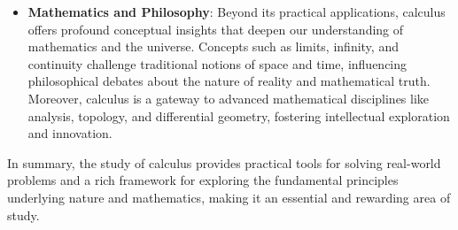 \begin{itemize}
    \item \textbf{Mathematics and Philosophy}: Beyond its practical applications, calculus offers profound conceptual insights that deepen our understanding of mathematics and the universe. Concepts such as limits, infinity, and continuity challenge traditional notions of space and time, influencing philosophical debates about the nature of reality and mathematical truth. Moreover, calculus is a gateway to advanced mathematical disciplines like analysis, topology, and differential geometry, fostering intellectual exploration and innovation.
\end{itemize}

In summary, the study of calculus provides practical tools for solving real-world problems and a rich framework for exploring the fundamental principles underlying nature and mathematics, making it an essential and rewarding area of study.

